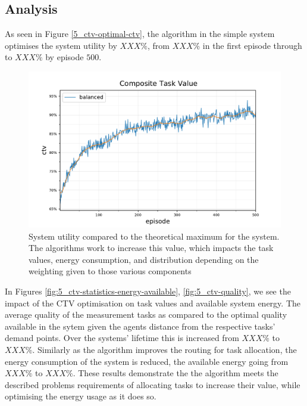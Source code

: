 \subsection{Analysis}

As seen in Figure \ref{5_ctv-optimal-ctv}, the \algorithmBalanced{}{} algorithm in the simple system optimises the system utility by $XXX\%$, from $XXX\%$ in the first episode through to $XXX\%$ by episode $500$.
\begin{figure}[ht]
	\centering
	\includegraphics[width=0.8\linewidth]{5_ctv-optimal-ctv}
	\captionsetup{labelfont=bf,singlelinecheck=on}
	\caption{System utility compared to the theoretical maximum for the \simulationSimple{}{} system. The algorithms work to increase this value, which impacts the task values, energy consumption, and distribution depending on the weighting given to those various components}
	\label{fig:5_ctv-optimal-ctv}
\end{figure}
In Figures \ref{fig:5_ctv-statistics-energy-available}, \ref{fig:5_ctv-quality}, we see the impact of the CTV optimisation on task values and available system energy. The average quality of the measurement tasks as compared to the optimal quality available in the sytem given the agents distance from the respective tasks' demand points. Over the systems' lifetime this is increased from $XXX\%$ to $XXX\%$. Similarly as the algorithm improves the routing for task allocation, the energy consumption of the system is reduced, the available energy going from  $XXX\%$ to $XXX\%$. These results demonstrate the the algorithm meets the described problems requirements of allocating tasks to increase their value, while optimising the energy usage as it does so.
 
